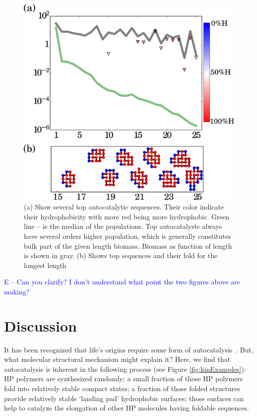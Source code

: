 \documentclass[journal=jacsat,manuscript=article,layout=twocolumn]{achemso}
\newcommand*{\blue}[1]{\textcolor{blue}{#1}}
\begin{document}
\begin{figure}[h!]
  \centering
  \includegraphics[width=\columnwidth]{pictures/mainPlayers.pdf} 
  \caption{\footnotesize{(a) Show several top autocatalytic sequences. Their color indicate their 
hydrophobicity with more red being more hydrophobic. Green line -- is the median of the 
populations. Top autocatalysts always have several orders higher population, which is generally 
constitutes bulk part of the given length biomass. Biomass as function of length is shown in 
gray. (b) Shows top sequences and their fold for the longest length}}
  \label{fig:mainplayers}
\end{figure}

\blue{E -- Can you clarify?  I don't understand what point the two figures above are making?}


\section{Discussion}
\label{sec:evolution}
 It has been recognized that life's origins require some form of 
autocatalysis~\cite{Kauffman1986,Dyson1985,Eigen1978}.  But, what molecular structural mechanism 
might explain it?  Here, we find that autocatalysis is inherent in the following process (see 
Figure \ref{fig:kinExamples}):  HP polymers 
are synthesized randomly; a small fraction of those HP polymers fold into relatively stable 
compact 
states; a fraction of those folded structures provide relatively stable `landing pad' hydrophobic 
surfaces; those surfaces can help to catalyze the elongation of other HP molecules having foldable 
sequences.
\end{document}
